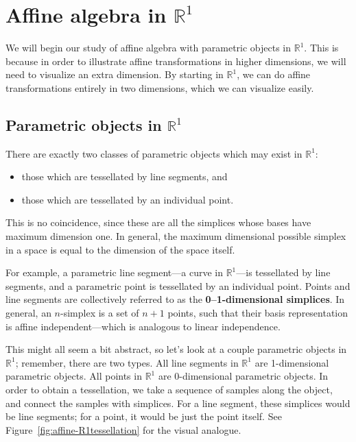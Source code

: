 \section{Affine algebra in \texorpdfstring{\(\mathbb{R}^{1}\)}{R1}}

We will begin our study of affine algebra with parametric objects
in \(\mathbb{R}^{1}\). This is because in order to illustrate 
affine transformations in higher dimensions, we will need to 
visualize an extra dimension. By starting in \(\mathbb{R}^{1}\), we 
can do affine transformations entirely in two dimensions, which we can
visualize easily.

\subsection{Parametric objects in \texorpdfstring{\(\mathbb{R}^{1}\)}{R1}}

There are exactly two classes of parametric objects which may exist in 
\(\mathbb{R}^{1}\): 
\begin{itemize}
    \item those which are tessellated by line segments, and  
    \item those which are tessellated by an individual point. 
\end{itemize}
This is no coincidence, since these are all the simplices whose bases 
have maximum dimension one. In general, the maximum dimensional possible 
simplex in a space is equal to the dimension of the space itself.

For example, a parametric line segment---a curve in 
\(\mathbb{R}^{1}\)---is tessellated by line segments, 
and a parametric point is tessellated by an individual point. Points 
and line segments are collectively referred to as the 
\textbf{0--1-dimensional simplices}. In general, an \(n\)-simplex is a 
set of \(n+1\) points, such that their basis representation is 
affine independent---which is analogous to linear independence.

This might all seem a bit abstract, so let's look at a couple parametric 
objects in \(\mathbb{R}^1\); remember, there are two types.
All line segments in \(\mathbb{R}^{1}\) are 1-dimensional parametric 
objects. All points in \(\mathbb{R}^{1}\) are 0-dimensional parametric 
objects. In order to obtain a tessellation, we take a sequence of samples
along the object, and connect the samples with simplices. For a
line segment, these simplices would be line segments; for a point, it would
be just the point itself. See Figure~\ref{fig:affine-R1tessellation} for 
the visual analogue.

